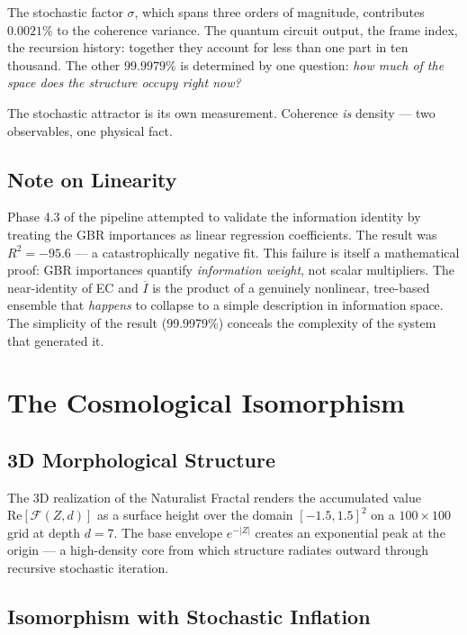 \documentclass[twocolumn,amsmath,amssymb,prl]{revtex4-2}
\begin{document}
The stochastic factor $\sigma$, which spans three orders of magnitude,
contributes $0.0021\%$ to the coherence variance.  The quantum circuit
output, the frame index, the recursion history: together they account for
less than one part in ten thousand.  The other $99.9979\%$ is determined by
one question: \emph{how much of the space does the structure occupy right
now?}

The stochastic attractor is its own measurement.  Coherence \emph{is}
density — two observables, one physical fact.

\subsection{Note on Linearity}

Phase 4.3 of the pipeline attempted to validate the information identity
by treating the GBR importances as linear regression coefficients.  The
result was $R^2 = -95.6$ — a catastrophically negative fit.  This failure
is itself a mathematical proof: GBR importances quantify \emph{information
weight}, not scalar multipliers.  The near-identity of EC and $\overline{I}$
is the product of a genuinely nonlinear, tree-based ensemble that
\emph{happens} to collapse to a simple description in information space.
The simplicity of the result (99.9979\%) conceals the complexity of the
system that generated it.

\section{The Cosmological Isomorphism}
\label{sec:cosmo}

\subsection{3D Morphological Structure}

The 3D realization of the Naturalist Fractal renders the accumulated value
$\mathrm{Re}[\mathcal{F}(Z, d)]$ as a surface height over the domain
$[-1.5, 1.5]^2$ on a $100 \times 100$ grid at depth $d = 7$.  The base
envelope $e^{-|Z|}$ creates an exponential peak at the origin — a
high-density core from which structure radiates outward through recursive
stochastic iteration.

\subsection{Isomorphism with Stochastic Inflation}
\end{document}
